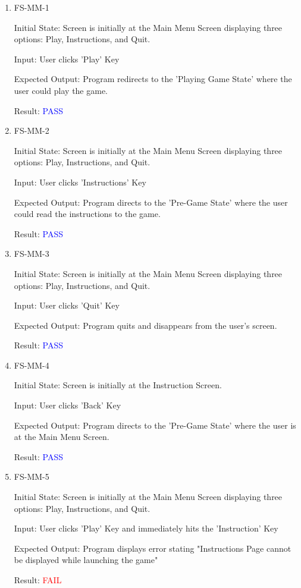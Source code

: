 \documentclass[12pt, titlepage]{article}
\begin{document}
\begin{enumerate}

\item{FS-MM-1\\}

Initial State: Screen is initially at the Main Menu Screen displaying three options: Play, Instructions, and Quit. 
					
Input: User clicks 'Play' Key
					
Expected Output: Program redirects to the 'Playing Game State' where the user could play the game.
					
Result: \textcolor{blue}{PASS}

					
\item{FS-MM-2\\}

Initial State: Screen is initially at the Main Menu Screen displaying three options: Play, Instructions, and Quit. 
					
Input: User clicks 'Instructions' Key
					
Expected Output: Program directs to the 'Pre-Game State' where the user could read the instructions to the game.
					
Result: \textcolor{blue}{PASS}

\item{FS-MM-3\\}
		
Initial State: Screen is initially at the Main Menu Screen displaying three options: Play, Instructions, and Quit. 
					
Input: User clicks 'Quit' Key
					
Expected Output: Program quits and disappears from the user's screen. 

Result: \textcolor{blue}{PASS}

\item{FS-MM-4\\}

Initial State: Screen is initially at the Instruction Screen.
					
Input: User clicks 'Back' Key
					
Expected Output: Program directs to the 'Pre-Game State' where the user is at the Main Menu Screen.
					
Result: \textcolor{blue}{PASS}

\item{FS-MM-5\\}
		
Initial State: Screen is initially at the Main Menu Screen displaying three options: Play, Instructions, and Quit. 
					
Input: User clicks 'Play' Key and immediately hits the 'Instruction' Key
					
Expected Output: Program displays error stating "Instructions Page cannot be displayed while launching the game" 

Result: \textcolor{red}{FAIL}

\end{enumerate}
\end{document}
